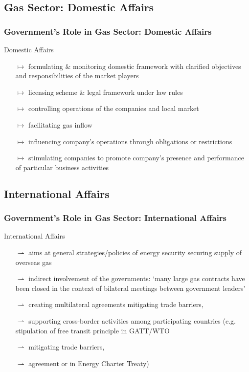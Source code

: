 \documentclass[pdflatex,compress,10pt,
	xcolor={dvipsnames,dvipsnames,svgnames,x11names,table},
	hyperref={
	colorlinks = true,
	breaklinks = true, 
	citecolor=NavyBlue, 
	urlcolor = blue, 
	filecolor=magenta} 
]{beamer}
\begin{document}
\subsection{Gas Sector: Domestic Affairs}
\begin{frame}\frametitle{Government's Role in Gas Sector: Domestic Affairs}

\begin{alertblock}{Domestic Affairs}
\begin{itemize}
	\item[$\mapsto$] formulating \& monitoring domestic framework with clarified objectives and responsibilities of the market players
	\item[$\mapsto$] licensing scheme \& legal framework under law rules 
	\item[$\mapsto$] controlling operations of the companies and local
market
	\item[$\mapsto$] facilitating gas inflow
	\item[$\mapsto$] influencing company’s operations through obligations or restrictions
	\item[$\mapsto$] stimulating companies to promote company’s presence and performance of particular business activities
\end{itemize}
\end{alertblock}
\end{frame}

\subsection{International Affairs}
\begin{frame}\frametitle{Government's Role in Gas Sector: International Affairs}

\begin{alertblock}{International Affairs}
\begin{itemize}
	\item [$\rightharpoonup$] aims at general strategies/policies of energy security securing supply of overseas gas
	\item [$\rightharpoonup$] indirect involvement of the governments: ‘many large gas contracts have been closed in the context of bilateral meetings between government leaders’
	\item [$\rightharpoonup$] creating multilateral agreements mitigating trade barriers,
	\item [$\rightharpoonup$] supporting cross-border activities among participating countries (e.g. stipulation of free transit principle in GATT/WTO
	\item [$\rightharpoonup$] mitigating trade barriers,
	\item [$\rightharpoonup$] agreement or in Energy Charter Treaty)
\end{itemize}
\end{alertblock}
 
\end{frame}
\end{document}
